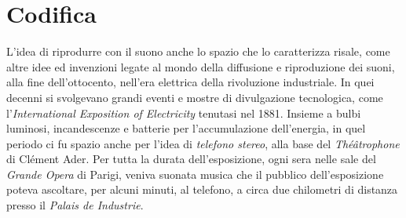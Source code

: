 \section{Codifica}

L'idea di riprodurre con il suono anche lo spazio che lo caratterizza risale,
come altre idee ed invenzioni legate al mondo della diffusione e riproduzione
dei suoni, alla fine dell'ottocento, nell'era elettrica della rivoluzione
industriale. In quei decenni si svolgevano grandi eventi e mostre di divulgazione
tecnologica, come l'\emph{International Exposition of Electricity} tenutasi nel 1881.
Insieme a bulbi luminosi, incandescenze e batterie per l'accumulazione
dell'energia, in quel periodo ci fu spazio anche per l'idea di \emph{telefono stereo},
alla base del \emph{Théâtrophone} di Clément Ader. Per tutta la durata
dell'esposizione, ogni sera nelle sale del \emph{Grande Opera} di Parigi, veniva
suonata musica che il pubblico dell'esposizione poteva ascoltare, per alcuni
minuti, al telefono, a circa due chilometri di distanza presso il
\emph{Palais de Industrie}.
